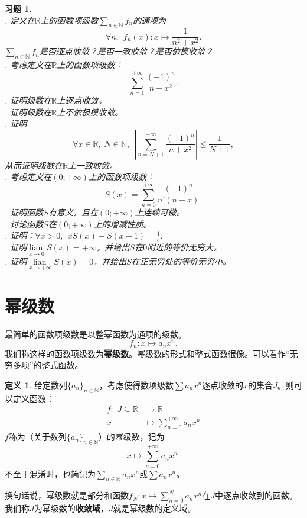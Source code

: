 \documentclass[12pt,UTF8]{ctexbook}
\newcommand{\lian}[1]{
    \underset{#1}{\operatorname{lian}\,}
}
\theoremstyle{definition}
\newtheorem{df}{定义}[section]
\theoremstyle{plain}
\newtheorem{xt}{习题}[section]
\begin{document}
\begin{appendix}
\begin{xt}
    \mbox{} \\
    . 定义在$\mathbb{R}$上的函数项级数$\sum_{n\in\mathbb{N}} f_n$的通项为
    $$ \forall n, \;\, f_n(x): x \mapsto \frac{1}{n^2 + x^2}.$$
    \indent $\sum_{n\in\mathbb{N}} f_n$是否逐点收敛？是否一致收敛？是否依模收敛？\\ 
    . 考虑定义在$\mathbb{R}$上的函数项级数：
    $$\sum_{n=1}^{+\infty} \frac{(-1)^n}{n + x^2}.$$
    . 证明级数在$\mathbb{R}$上逐点收敛。\\
    . 证明级数在$\mathbb{R}$上不依极模收敛。\\
    . 证明
    $$\forall x\in\mathbb{R},\; N\in\mathbb{N},\;\,\left|\sum_{n=N+1}^{+\infty} \frac{(-1)^n}{n + x^2}\right| \leqslant \frac{1}{N+1},$$
    \indent 从而证明级数在$\mathbb{R}$上一致收敛。\\
    . 考虑定义在$(0;+\infty)$上的函数项级数：
    $$S(x) = \sum_{n=0}^{+\infty} \frac{(-1)^n}{n!(n + x)}.$$
    . 证明函数$S$有意义，且在$(0;+\infty)$上连续可微。\\
    . 讨论函数$S$在$(0;+\infty)$上的增减性质。\\
    . 证明：$\forall x > 0,\;\, xS(x) - S(x + 1) = \frac{1}{e}.$ \\
    . 证明$\lian{x\to 0} S(x) = +\infty$，并给出$S$在$0$附近的等价无穷大。\\
    . 证明$\lian{x\to +\infty} S(x) = 0$，并给出$S$在正无穷处的等价无穷小。\\
\end{xt}

\section{幂级数}

最简单的函数项级数是以整幂函数为通项的级数。
$$ f_n : x \mapsto a_n x^n.$$
我们称这样的函数项级数为\textbf{幂级数}。幂级数的形式和整式函数很像。可以看作“无穷多项”的整式函数。

\begin{df}
    给定数列$\{a_n\}_{n\in\mathbb{N}}$，考虑使得数项级数$\sum a_n x^n$逐点收敛的$x$的集合$J$。则可以定义函数：
    $$
    \begin{array}{rl}
        f: \,\, J\subseteq\mathbb{R} &\rightarrow \mathbb{R} \\
        x &\displaystyle \mapsto \sum_{n=0}^{+\infty} a_n x^n        
    \end{array}
    $$
    $f$称为（关于数列$\{a_n\}_{n\in\mathbb{N}}$）的幂级数，记为
    $$ x\mapsto \sum_{n=0}^{+\infty} a_n x^n. $$
    不至于混淆时，也简记为$\sum_{n\in\mathbb{N}} a_n x^n$或$\sum a_n x^n$。
\end{df}
换句话说，幂级数就是部分和函数$f_N : x\mapsto \sum_{n=0}^{N} a_n x^n$在$J$中逐点收敛到的函数。
我们称$J$为幂级数的\textbf{收敛域}，$J$就是幂级数的定义域。


\end{appendix}
\end{document}
